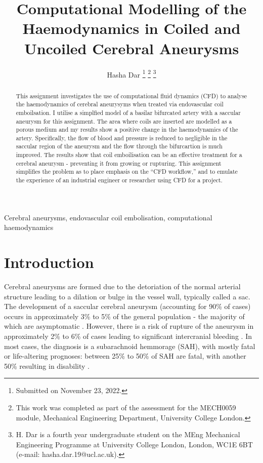 \documentclass[journal,twoside,web]{ieeecolor}
\begin{document}
\title{Computational Modelling of the Haemodynamics in Coiled and Uncoiled Cerebral Aneurysms}
\author{Hasha Dar
    \thanks{Submitted on November 23, 2022.}
    \thanks{This work was completed as part of the assessment for the MECH0059 module, Mechanical Engineering Department, University College London. }
    \thanks{H. Dar is a fourth year undergraduate student on the MEng Mechanical Engineering Programme at University College London, London, WC1E 6BT (e-mail: hasha.dar.19@ucl.ac.uk). }}

\maketitle

\begin{abstract}
    This assignment investigates the use of computational fluid dynamics (CFD) to analyse the haemodynamics of cerebral aneurysyms when treated via endovascular coil emboilsation. I utilise a simplfied model of a basilar bifurcated artery with a saccular aneurysm for this assignment. The area where coils are inserted are modelled as a porous medium and my results show a positive change in the haemodynamics of the artery. Specifically, the flow of blood and pressure is reduced to negligible in the saccular region of the aneurysm and the flow through the bifurcartion is much improved. The results show that coil emboilisation can be an effective treatment for a cerebral aneurysm - preventing it from growing or rupturing. This assignment simplifies the problem as to place emphasis on the ``CFD workflow,'' and to emulate the experience of an industrial engineer or researcher using CFD for a project.
\end{abstract}

\begin{IEEEkeywords}
    Cerebral aneurysms, endovascular coil embolisation, computational haemodynamics
\end{IEEEkeywords}

\section{Introduction}
Cerebral aneurysms are formed due to the detoriation of the normal arterial structure leading to a dilation or bulge in the vessel wall, typically called a sac. The development of a saccular cerebral aneurysm (accounting for 90\% of cases) occurs in approximately 3\% to 5\% of the general population - the majority of which are asymptomatic \cite{saccularAneurysm, doi:10.1161/STROKEAHA.113.002390}. However, there is a risk of rupture of the aneurysm in approximately 2\% to 6\% of cases leading to significant intercranial bleeding \cite{doi:10.1161/01.STR.29.1.251}. In most cases, the diagnosis is a subarachnoid hemmorage (SAH), with mostly fatal or life-altering prognoses: between 25\% to 50\% of SAH are fatal, with another 50\% resulting in disability \cite{intracranialAneurysms}. 
\end{document}
